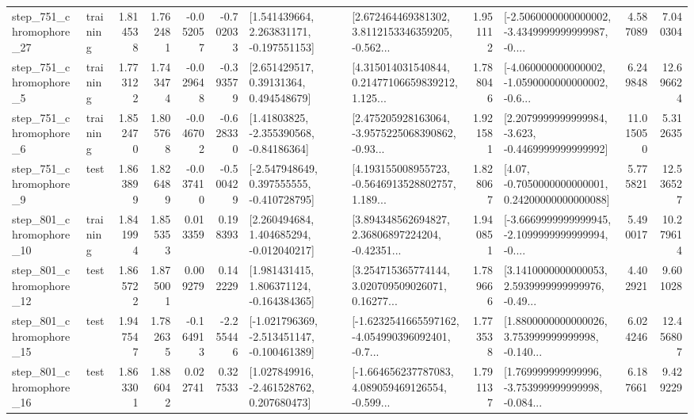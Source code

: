 \begin{tabular}{llrrrrllrlrr}
  step\_751\_chromophore\_27 &  training &      1.814538 &    1.762481 &     -0.052057 & -0.702033 &    [1.541439664, 2.263831171, -0.197551153] &  [2.672464469381302, 3.8112153346359205, -0.562... &       1.951112 &  [-2.5060000000000002, -3.4349999999999987, -0.... &            4.587089 &          7.040304 \\
   step\_751\_chromophore\_5 &  training &      1.773122 &    1.743474 &     -0.029648 & -0.393579 &      [2.651429517, 0.39131364, 0.494548679] &  [4.315014031540844, 0.21477106659839212, 1.125... &       1.788046 &  [-4.060000000000002, -1.0590000000000002, -0.6... &            6.249848 &         12.696624 \\
   step\_751\_chromophore\_6 &  training &      1.852470 &    1.805768 &     -0.046702 & -0.628330 &     [1.41803825, -2.355390568, -0.84186364] &  [2.475205928163064, -3.9575225068390862, -0.93... &       1.921581 &  [2.2079999999999984, -3.623, -0.4469999999999992] &           11.015050 &          5.312635 \\
   step\_751\_chromophore\_9 &      test &      1.863899 &    1.826489 &     -0.037410 & -0.500429 &   [-2.547948649, 0.397555555, -0.410728795] &  [4.193155008955723, -0.5646913528802757, 1.189... &       1.828067 &   [4.07, -0.7050000000000001, 0.24200000000000088] &            5.775821 &         12.536527 \\
  step\_801\_chromophore\_10 &  training &      1.841994 &    1.855353 &      0.013359 &  0.198393 &    [2.260494684, 1.404685294, -0.012040217] &  [3.894348562694827, 2.36806897224204, -0.42351... &       1.940851 &  [-3.6669999999999945, -2.1099999999999994, -0.... &            5.490017 &         10.279614 \\
  step\_801\_chromophore\_12 &      test &      1.865722 &    1.875001 &      0.009279 &  0.142229 &    [1.981431415, 1.806371124, -0.164384365] &  [3.254715365774144, 3.020709509026071, 0.16277... &       1.789666 &  [3.1410000000000053, 2.5939999999999976, -0.49... &            4.402921 &          9.601028 \\
  step\_801\_chromophore\_15 &      test &      1.947547 &    1.782635 &     -0.164913 & -2.255446 &  [-1.021796369, -2.513451147, -0.100461389] &  [-1.6232541665597162, -4.054990396092401, -0.7... &       1.773538 &  [1.8800000000000026, 3.753999999999998, -0.140... &            6.024246 &         12.456807 \\
  step\_801\_chromophore\_16 &      test &      1.863301 &    1.886042 &      0.022741 &  0.327533 &    [1.027849916, -2.461528762, 0.207680473] &  [-1.664656237787083, 4.089059469126554, -0.599... &       1.791137 &  [1.769999999999996, -3.753999999999998, -0.084... &            6.187661 &          9.429229 \\

\end{tabular}
